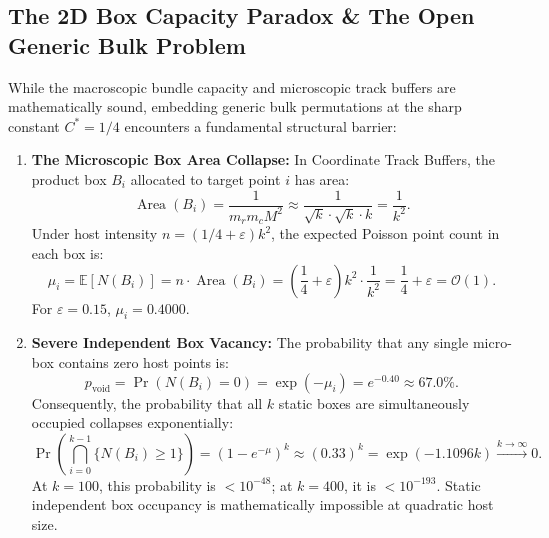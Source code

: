 \documentclass[
  11pt,
]{article}
\begin{document}
\subsection{The 2D Box Capacity Paradox \& The Open Generic Bulk Problem}\label{sec:capacity-paradox}

While the macroscopic bundle capacity and microscopic track buffers are mathematically sound, embedding generic bulk permutations at the sharp constant $C^* = 1/4$ encounters a fundamental structural barrier:

\begin{enumerate}
\item \textbf{The Microscopic Box Area Collapse:}
In Coordinate Track Buffers, the product box $B_i$ allocated to target point $i$ has area:
\begin{equation}
\operatorname{Area}(B_i) = \frac{1}{m_r m_c M^2} \approx \frac{1}{\sqrt{k} \cdot \sqrt{k} \cdot k} = \frac{1}{k^2}.
\end{equation}
Under host intensity $n = (1/4+\varepsilon)k^2$, the expected Poisson point count in each box is:
\begin{equation}
\mu_i = \mathbb{E}[N(B_i)] = n \cdot \operatorname{Area}(B_i) = \left(\frac{1}{4} + \varepsilon\right) k^2 \cdot \frac{1}{k^2} = \frac{1}{4} + \varepsilon = \mathcal{O}(1).
\end{equation}
For $\varepsilon = 0.15$, $\mu_i = 0.4000$.

\item \textbf{Severe Independent Box Vacancy:}
The probability that any single micro-box contains zero host points is:
\begin{equation}
p_{\mathrm{void}} = \Pr(N(B_i) = 0) = \exp(-\mu_i) = e^{-0.40} \approx 67.0\%.
\end{equation}
Consequently, the probability that all $k$ static boxes are simultaneously occupied collapses exponentially:
\begin{equation}
\Pr\left( \bigcap_{i=0}^{k-1} \{N(B_i) \ge 1\} \right) = (1 - e^{-\mu})^k \approx (0.33)^k = \exp(-1.1096 k) \xrightarrow{k \to \infty} 0.
\end{equation}
At $k = 100$, this probability is $< 10^{-48}$; at $k = 400$, it is $< 10^{-193}$. Static independent box occupancy is mathematically impossible at quadratic host size.


\end{enumerate}
\end{document}
